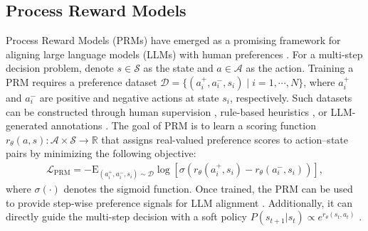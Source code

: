 \subsection{Process Reward Models}
Process Reward Models (PRMs) have emerged as a promising framework for aligning large language models (LLMs) with human preferences \cite{zeng2025versaprm,wang2025visualprm,lightman2023let}. 
For a multi-step decision problem, denote $s \in \mathcal{S}$ as the state and $a \in \mathcal{A}$ as the action.
Training a PRM requires a preference dataset $\mathcal{D} = \{(a^{+}_{i}, a^{-}_{i}, s_{i}) \mid i = 1, \cdots, N\}$, where $a^{+}_{i}$ and $a^{-}_{i}$ are positive and negative actions at state $s_{i}$, respectively. 
Such datasets can be constructed through human supervision \cite{lightman2023let}, rule-based heuristics \cite{murule}, or LLM-generated annotations \cite{xiong2025rag}. 
The goal of PRM is to learn a scoring function $r_{\theta}(a, s): \mathcal{A} \times \mathcal{S} \rightarrow \mathbb{R}$ that assigns real-valued preference scores to action–state pairs by minimizing the following objective:
\begin{equation}
\begin{aligned}
\mathcal{L}_{\mathrm{PRM}}=-\mathrm{E}_{(a^{+}_{i},a^{-}_{i},s_{i})\sim\mathcal{D}} \log[\sigma (r_{\theta}(a^{+}_{i}, s_{i})-r_{\theta}(a^{-}_{i}, s_{i}))],
\end{aligned}
\end{equation}
where $\sigma(\cdot)$ denotes the sigmoid function. 
Once trained, the PRM can be used to provide step-wise preference signals for LLM alignment \cite{lightman2023let,wang2025visualprm}. 
Additionally, it can directly guide the multi-step decision with a soft policy $P(s_{t+1}|s_{t})\propto e^{r_{\theta}(s_{t},a_{t})}$ \cite{cui2025process,wang2025visualprm,xiong2025rag,zhu2025retrieval}.



